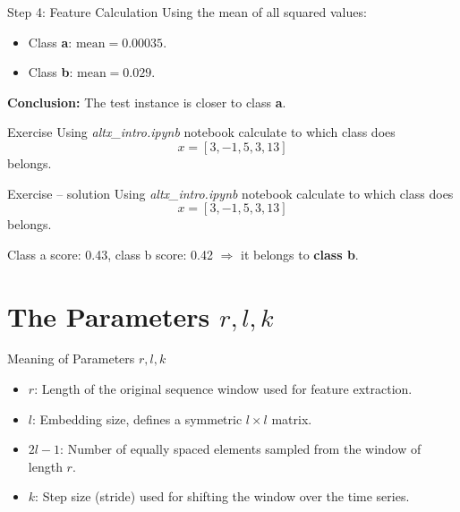 \documentclass{beamer}
\begin{document}
\begin{frame}{Step 4: Feature Calculation}
  Using the mean of all squared values:
  \begin{itemize}
    \item Class \textbf{a}: \( \text{mean} = 0.00035 \).
    \item Class \textbf{b}: \( \text{mean} = 0.029 \).
  \end{itemize}

  \textbf{Conclusion:} The test instance is closer to class \textbf{a}.
\end{frame}

\begin{frame}{Exercise}
  Using \emph{altx\_intro.ipynb} notebook calculate to which class does 
  \begin{equation}
    x = [3, -1, 5, 3, 13]
  \end{equation}
  belongs.
\end{frame}

\begin{frame}{Exercise -- solution}
  Using \emph{altx\_intro.ipynb} notebook calculate to which class does 
  \begin{equation}
    x = [3, -1, 5, 3, 13]
  \end{equation}
  belongs.

  Class a score: 0.43, class b score: 0.42 \(\Rightarrow\) it belongs to \textbf{class b}.
\end{frame}

\section{The Parameters \( r, l, k \)}

\begin{frame}{Meaning of Parameters \( r, l, k \)}
  \begin{itemize}
    \item \( r \): Length of the original sequence window used for feature extraction.
    \item \( l \): Embedding size, defines a symmetric \( l \times l \) matrix.
    \item \( 2l - 1 \): Number of equally spaced elements sampled from the window of length \( r \).
    \item \( k \): Step size (stride) used for shifting the window over the time series.
  \end{itemize}
\end{frame}
\end{document}
